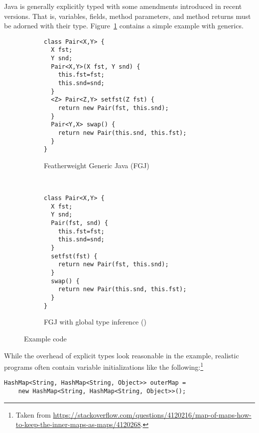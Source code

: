 Java is generally explicitly typed with some amendments introduced in
recent versions. That is, 
variables, fields, method parameters, and method returns must be
adorned with their type. Figure~\ref{fig:intro-example-generic-fj}
contains a simple example with generics.
\begin{figure}[tp]
  \begin{subfigure}[t]{0.49\linewidth}
\begin{lstlisting}[style=fgj]
class Pair<X,Y> {
  X fst;
  Y snd;
  Pair<X,Y>(X fst, Y snd) {
    this.fst=fst;
    this.snd=snd;
  }
  <Z> Pair<Z,Y> setfst(Z fst) {
    return new Pair(fst, this.snd);
  }
  Pair<Y,X> swap() {
    return new Pair(this.snd, this.fst);
  }
}  
\end{lstlisting}
    \caption{Featherweight Generic Java (FGJ)}
    \label{fig:intro-example-generic-fj}
  \end{subfigure}
  ~
  \begin{subfigure}[t]{0.49\linewidth}
\begin{lstlisting}[style=tfgj]
class Pair<X,Y> {
  X fst;
  Y snd;
  Pair(fst, snd) {
    this.fst=fst; 
    this.snd=snd;
  }
  setfst(fst) {
    return new Pair(fst, this.snd);
  }
  swap() {
    return new Pair(this.snd, this.fst);
  }
}  
\end{lstlisting}
    \caption{FGJ with global type inference (\TFGJ)}
    \label{fig:intro-example-generic-jtx}
  \end{subfigure}
  \caption{Example code}
  \label{fig:intro-example-code}
\end{figure}

While the overhead of explicit types look reasonable in the example,
realistic programs often contain variable initializations like
the following:\footnote{Taken from
  \url{https://stackoverflow.com/questions/4120216/map-of-maps-how-to-keep-the-inner-maps-as-maps/4120268}.} 
\begin{lstlisting}[basicstyle=\ttfamily\fontsize{8}{9.6}\selectfont,style=fgj]
  HashMap<String, HashMap<String, Object>> outerMap =
    new HashMap<String, HashMap<String, Object>>();
\end{lstlisting}

